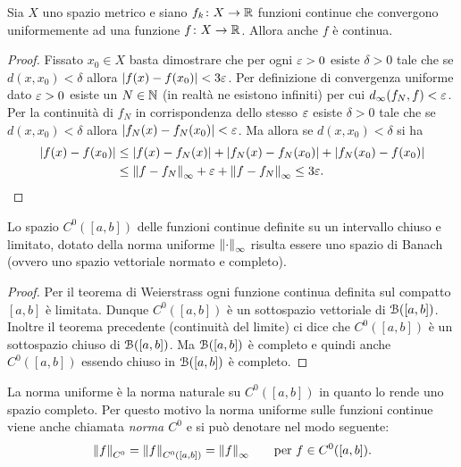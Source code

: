 \begin{theorem}
\mymark{***}
Sia $X$ uno spazio metrico e siano $f_k\colon X\to \mathbb R$
funzioni continue che
convergono uniformemente ad una funzione $f\colon X \to \mathbb R$. Allora anche $f$ è continua.
\end{theorem}
%
\begin{proof}
\mymark{***}
Fissato $x_0\in X$ basta dimostrare che per ogni $\varepsilon>0$
esiste $\delta>0$ tale che se $d(x,x_0)< \delta$ allora ${\left|f(x)-f(x_0)\right|} < 3 \varepsilon$.
Per definizione di convergenza uniforme dato $\varepsilon>0$
esiste un $N\in \mathbb N$ (in realtà ne esistono infiniti) per cui
$d_\infty(f_N,f)< \varepsilon$. Per la continuità di $f_N$ in corrispondenza dello stesso $\varepsilon$ esiste $\delta>0$
tale che se $d(x,x_0) < \delta$ allora ${\left|f_N(x)-f_N(x_0)\right|} < \varepsilon$. Ma allora se $d(x,x_0)<\delta$ si ha
\begin{align*}
{\left|f(x)-f(x_0)\right|}
&\le {\left|f(x) - f_N(x)\right|}
 + {\left|f_N(x)-f_N(x_0)\right|}
 + {\left|f_N(x_0) - f(x_0)\right|} \\
 &\le {\left\Vert f-f_N\right\Vert}_\infty + \varepsilon + {\left\Vert f-f_N\right\Vert}_\infty
  \le 3\varepsilon.
\end{align*}
\end{proof}

\begin{theorem}[completezza di $C^0({[a,b]})$]
\mymark{***}
Lo spazio $C^0([a,b])$ delle funzioni continue definite su un intervallo chiuso e limitato, dotato della norma uniforme ${\left\Vert \cdot\right\Vert}_\infty$ risulta essere uno spazio di Banach (ovvero uno spazio vettoriale normato e completo).
\end{theorem}
%
\begin{proof}
Per il teorema di Weierstrass ogni funzione continua definita sul compatto $[a,b]$ è limitata. Dunque $C^0([a,b])$ è un sottospazio vettoriale di $\mathcal B([a,b])$. Inoltre il teorema precedente (continuità del limite) ci dice che $C^0([a,b])$ è un sottospazio chiuso di $\mathcal B([a,b])$.
Ma $\mathcal B([a,b])$ è completo e quindi anche $C^0([a,b])$ essendo chiuso in $\mathcal B([a,b])$ è completo.
\end{proof}

La norma uniforme è la norma naturale su $C^0([a,b])$ in quanto lo rende uno spazio completo. Per questo motivo la norma uniforme sulle funzioni continue
viene anche chiamata \emph{norma $C^0$} e si
può denotare nel modo seguente:
\[
  {\left\Vert f\right\Vert}_{C^0} = {\left\Vert f\right\Vert}_{C^0([a,b])} = {\left\Vert f\right\Vert}_\infty
  \qquad\text{per $f\in C^0([a,b])$.}
\]

